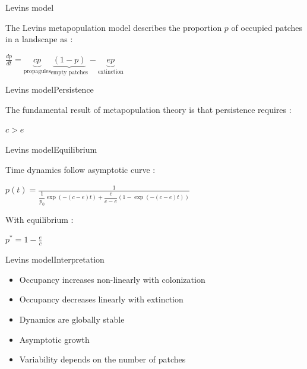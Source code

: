 \documentclass[10pt,aspectratio=149]{beamer}
\newcommand{\keyeq}[1]{%
  \begin{center}
    \Large$\displaystyle #1$
  \end{center}%
}
\begin{document}

\begin{frame}{Levins model}

    The Levins metapopulation model describes the proportion $p$ of occupied patches in a landscape as :

    \keyeq{\frac{dp}{dt} = \underbrace{cp}_{\text{propagules}}\underbrace{(1-p)}_{\text{empty patches}} - \underbrace{ep}_{\text{extinction}}}

\end{frame}


\begin{frame}{Levins model}{Persistence}

    The fundamental result of metapopulation theory is that persistence requires :

    \keyeq{c>e}
    
\end{frame}


\begin{frame}{Levins model}{Equilibrium}

    Time dynamics follow asymptotic curve :

    \keyeq{p(t) = \frac{1}{\dfrac{1}{p_0}\exp(-(c-e)t)+\dfrac{c}{c-e}\left(1-\exp(-(c-e)t)\right)}}

    With equilibrium :

    \keyeq{p^*= 1 - \frac{e}{c}}
    
\end{frame}


\begin{frame}{Levins model}{Interpretation}

    \begin{itemize}
        \item Occupancy increases non-linearly with colonization 
        \item Occupancy decreases linearly with extinction
        \item Dynamics are globally stable
        \item Asymptotic growth
        \item Variability depends on the number of patches
    \end{itemize}
    
\end{frame}
\end{document}
